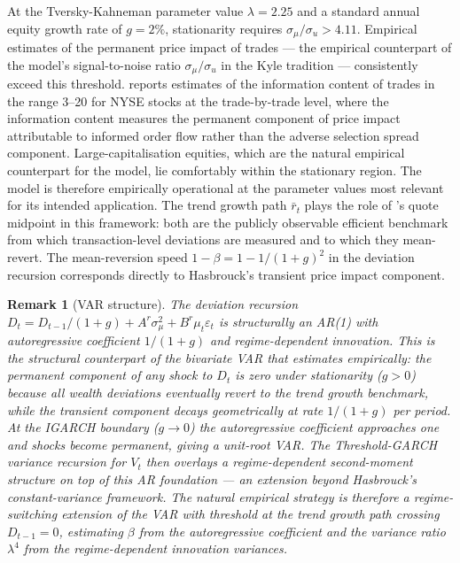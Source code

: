 \documentclass[12pt,a4paper]{article}
\newtheorem{remark}[theorem]{Remark}
\theoremstyle{definition}
\begin{document}
At the Tversky-Kahneman parameter value $\lambda = 2.25$ and a standard
annual equity growth rate of $g = 2\%$, stationarity requires
$\sigma_\mu/\sigma_u > 4.11$. Empirical estimates of the permanent price impact of trades --- the
empirical counterpart of the model's signal-to-noise ratio
$\sigma_\mu/\sigma_u$ in the Kyle tradition --- consistently exceed this
threshold. \citet{hasbrouck1991} reports estimates of the information
content of trades in the range 3--20 for NYSE stocks at the trade-by-trade
level, where the information content measures the permanent component of
price impact attributable to informed order flow rather than the adverse
selection spread component. Large-capitalisation equities, which are the natural empirical counterpart
for the model, lie comfortably within the stationary region. The model is
therefore empirically operational at the parameter values most relevant for
its intended application. The trend growth path $\bar{r}_t$ plays the role
of \citet{hasbrouck1991}'s quote midpoint in this framework: both are the
publicly observable efficient benchmark from which transaction-level
deviations are measured and to which they mean-revert. The mean-reversion
speed $1 - \beta = 1 - 1/(1+g)^2$ in the deviation recursion corresponds
directly to Hasbrouck's transient price impact component.

\begin{remark}[VAR structure]
\label{rem:var}
The deviation recursion $D_t = D_{t-1}/(1+g) + A^r\sigma^2_\mu +
B^r \mu_t\varepsilon_t$ is structurally an AR(1) with autoregressive
coefficient $1/(1+g)$ and regime-dependent innovation. This is the
structural counterpart of the bivariate VAR that \citet{hasbrouck1991}
estimates empirically: the permanent component of any shock to $D_t$
is zero under stationarity ($g > 0$) because all wealth deviations
eventually revert to the trend growth benchmark, while the transient
component decays geometrically at rate $1/(1+g)$ per period. At the
IGARCH boundary ($g \to 0$) the autoregressive coefficient approaches
one and shocks become permanent, giving a unit-root VAR. The Threshold-GARCH
variance recursion for $V_t$ then overlays a regime-dependent second-moment
structure on top of this AR foundation --- an extension beyond Hasbrouck's
constant-variance framework. The natural empirical strategy is therefore a
regime-switching extension of the \citet{hasbrouck1991} VAR with threshold
at the trend growth path crossing $D_{t-1} = 0$, estimating $\beta$ from
the autoregressive coefficient and the variance ratio $\lambda^4$ from the
regime-dependent innovation variances.
\end{remark}
\end{document}

